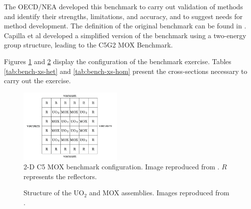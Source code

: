 \documentclass[letterpaper]{article}
\begin{document}
The \gls{OECD}/\gls{NEA} developed this benchmark to carry out validation of methods and identify their strengths, limitations, and accuracy, and to suggest needs for method development.
The definition of the original benchmark can be found in \cite{oecdnea_benchmark_2003}.
Capilla et al \cite{capilla_applications_2009} developed a simplified version of the benchmark using a two-energy group structure, leading to the C5G2 MOX Benchmark.

Figures \ref{res:2d-bench-config1} and \ref{res:2d-bench-config2} display the configuration of the benchmark exercise.
Tables \ref{tab:bench-xs-het} and \ref{tab:bench-xs-hom} present the cross-sections necessary to carry out the exercise.

\begin{figure}[h!]
    \centering
    \includegraphics[width=0.45\textwidth]{figures/bench-config}
    \caption{2-D C5 MOX benchmark configuration. Image reproduced from \cite{capilla_applications_2009}. $R$ represents the reflectors.}
    \label{res:2d-bench-config1}
\end{figure}

\begin{figure}[htbp!]
    \centering
    \caption{Structure of the UO$_2$ and MOX assemblies. Images reproduced from \cite{capilla_applications_2009}.}
    \label{res:2d-bench-config2}
\end{figure}
\end{document}
